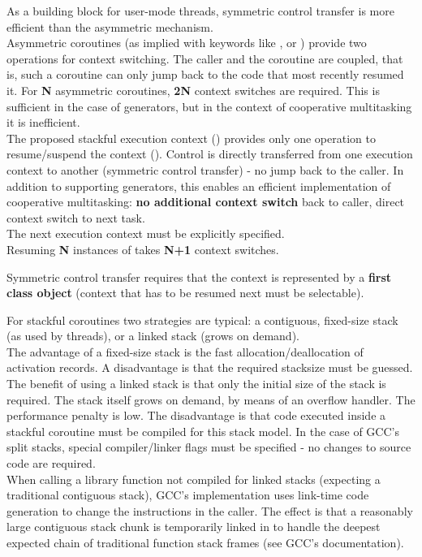 As a building block for user-mode threads, symmetric control transfer is more
efficient than the asymmetric mechanism.\\
\newline
Asymmetric coroutines (as implied with keywords like \resumable, \await or
\yield) provide two operations for context switching. The caller and the
coroutine are coupled, that is, such a coroutine can only jump back to the code
that most recently resumed it.
For {\bfseries N} asymmetric coroutines, {\bfseries 2N} context switches are
required. This is sufficient in the case of generators, but in the context of
cooperative multitasking it is inefficient.\\
\newline
The proposed stackful execution context (\ectx) provides only one operation to
resume/suspend the context (\op). Control is directly transferred from one
execution context to another (symmetric control transfer) - no jump back to
the caller. In addition to supporting generators, this enables an efficient
implementation of cooperative multitasking: {\bfseries no additional context
switch} back to caller, direct context switch to next task.\\
The next execution context must be explicitly specified.\\
\newline
{}
Resuming {\bfseries N} instances of \ectx takes {\bfseries N+1} context
switches.


Symmetric control transfer requires that the context is represented by a
{\bfseries first class object} (context that has to be resumed next must be
selectable).


For stackful coroutines two strategies are typical: a contiguous, fixed-size
stack (as used by threads), or a linked stack (grows on demand).\\
The advantage of a fixed-size stack is the fast allocation/deallocation of
activation records. A disadvantage is that the required stacksize must
be guessed.\\
The benefit of using a linked stack is that only the initial size of the stack
is required. The stack itself grows on demand, by means of an overflow
handler. The performance penalty is low. The disadvantage is that code
executed inside a stackful coroutine must be compiled for this stack model. In
the case of GCC's split stacks, special compiler/linker flags must be
specified - no changes to source code are required.\\
When calling a library function not compiled for linked stacks (expecting a
traditional contiguous stack), GCC's implementation uses link-time code
generation to change the instructions in the caller. The effect is that a
reasonably large contiguous stack chunk is temporarily linked in to handle the
deepest expected chain of traditional function stack frames (see GCC's
documentation\cite{gccsplit}).
